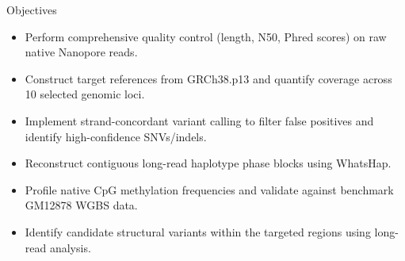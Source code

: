 \documentclass[aspectratio=169, 10pt]{beamer}
\begin{document}
\begin{frame}{Objectives}
    \vspace{0.3cm}
    \begin{itemize}
        \item Perform comprehensive quality control (length, N50, Phred scores) on raw native Nanopore reads.
        \item Construct target references from GRCh38.p13 and quantify coverage across 10 selected genomic loci.
        \item Implement strand-concordant variant calling to filter false positives and identify high-confidence SNVs/indels.
        \item Reconstruct contiguous long-read haplotype phase blocks using WhatsHap.
        \item Profile native CpG methylation frequencies and validate against benchmark GM12878 WGBS data.
        \item Identify candidate structural variants within the targeted regions using long-read analysis.
    \end{itemize}
\end{frame}
\end{document}
